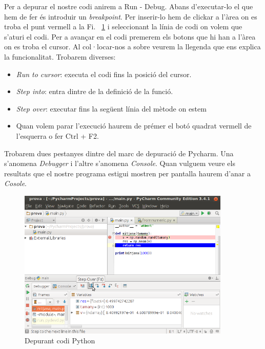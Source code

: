 Per a depurar el nostre codi anirem a Run - Debug. Abans d'executar-lo el que hem de fer és introduir un \emph{breakpoint}. Per inserir-lo hem de clickar a l'àrea on es troba el punt vermell a la Fi. ~\ref{fig:debug} i seleccionant la línia de codi on volem que s'aturi el codi. Per a avançar en el codi premerem els botons que hi han a l'àrea on es troba el cursor. Al col·locar-nos a sobre veurem la llegenda que ens explica la funcionalitat. Trobarem diverses:

\begin{itemize}
\item \emph{Run to cursor}: executa el codi fins la posició del cursor.
\item \emph{Step into}: entra dintre de la definició de la funció.
\item \emph{Step over}: executar fins la següent línia del mètode on estem
\item Quan volem parar l'execució haurem de prémer el botó quadrat vermell de l'esquerra o fer Ctrl + F2.
\end{itemize}




Trobarem dues pestanyes dintre del marc de depuració de Pycharm. Una s'anomena \emph{Debugger} i l'altre s'anomena \emph{Console}. Quan vulguem veure els resultats que el nostre programa estigui mostren per pantalla haurem d'anar a \emph{Cosole}.


\begin{figure}[!h]
    \begin{centering}
    \includegraphics[width=0.9\textwidth]{img/debug.png}
    \caption{Depurant codi Python}
    \label{fig:debug}
    \end{centering}
\end{figure}




